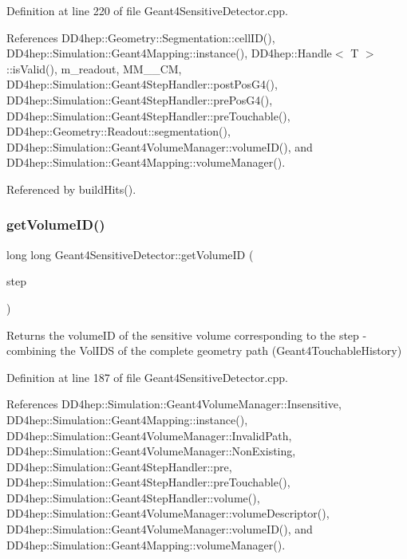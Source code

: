 Definition at line 220 of file Geant4\+Sensitive\+Detector.\+cpp.



References D\+D4hep\+::\+Geometry\+::\+Segmentation\+::cell\+I\+D(), D\+D4hep\+::\+Simulation\+::\+Geant4\+Mapping\+::instance(), D\+D4hep\+::\+Handle$<$ T $>$\+::is\+Valid(), m\+\_\+readout, M\+M\+\_\+\_\+\+CM, D\+D4hep\+::\+Simulation\+::\+Geant4\+Step\+Handler\+::post\+Pos\+G4(), D\+D4hep\+::\+Simulation\+::\+Geant4\+Step\+Handler\+::pre\+Pos\+G4(), D\+D4hep\+::\+Simulation\+::\+Geant4\+Step\+Handler\+::pre\+Touchable(), D\+D4hep\+::\+Geometry\+::\+Readout\+::segmentation(), D\+D4hep\+::\+Simulation\+::\+Geant4\+Volume\+Manager\+::volume\+I\+D(), and D\+D4hep\+::\+Simulation\+::\+Geant4\+Mapping\+::volume\+Manager().



Referenced by build\+Hits().

\hypertarget{class_d_d4hep_1_1_simulation_1_1_geant4_sensitive_detector_adb27c3e691e051044fbf1bd06cd70cac}{}\label{class_d_d4hep_1_1_simulation_1_1_geant4_sensitive_detector_adb27c3e691e051044fbf1bd06cd70cac} 
\subsubsection{\texorpdfstring{get\+Volume\+I\+D()}{getVolumeID()}}
{\footnotesize\ttfamily long long Geant4\+Sensitive\+Detector\+::get\+Volume\+ID (\begin{DoxyParamCaption}\item[{G4\+Step $\ast$}]{step }\end{DoxyParamCaption})}

Returns the volume\+ID of the sensitive volume corresponding to the step -\/ combining the Vol\+I\+DS of the complete geometry path (Geant4\+Touchable\+History) 

Definition at line 187 of file Geant4\+Sensitive\+Detector.\+cpp.



References D\+D4hep\+::\+Simulation\+::\+Geant4\+Volume\+Manager\+::\+Insensitive, D\+D4hep\+::\+Simulation\+::\+Geant4\+Mapping\+::instance(), D\+D4hep\+::\+Simulation\+::\+Geant4\+Volume\+Manager\+::\+Invalid\+Path, D\+D4hep\+::\+Simulation\+::\+Geant4\+Volume\+Manager\+::\+Non\+Existing, D\+D4hep\+::\+Simulation\+::\+Geant4\+Step\+Handler\+::pre, D\+D4hep\+::\+Simulation\+::\+Geant4\+Step\+Handler\+::pre\+Touchable(), D\+D4hep\+::\+Simulation\+::\+Geant4\+Step\+Handler\+::volume(), D\+D4hep\+::\+Simulation\+::\+Geant4\+Volume\+Manager\+::volume\+Descriptor(), D\+D4hep\+::\+Simulation\+::\+Geant4\+Volume\+Manager\+::volume\+I\+D(), and D\+D4hep\+::\+Simulation\+::\+Geant4\+Mapping\+::volume\+Manager().



